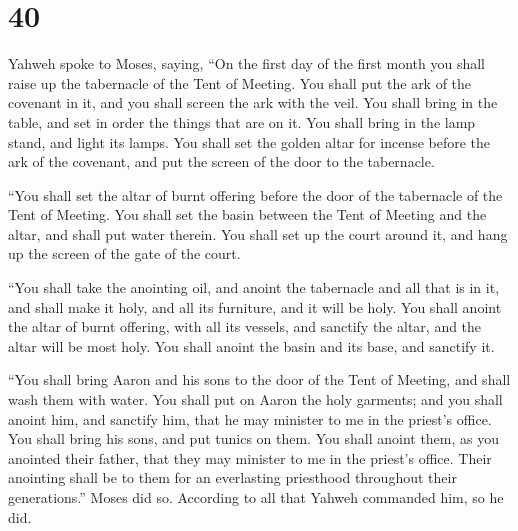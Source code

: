 \hypertarget{section-39}{%
\section{40}\label{section-39}}

 Yahweh spoke to Moses, saying,  ``On the
first day of the first month you shall raise up the tabernacle of the
Tent of Meeting.  You shall put the ark of the covenant in
it, and you shall screen the ark with the veil.  You shall
bring in the table, and set in order the things that are on it. You
shall bring in the lamp stand, and light its lamps.  You
shall set the golden altar for incense before the ark of the covenant,
and put the screen of the door to the tabernacle.

 ``You shall set the altar of burnt offering before the
door of the tabernacle of the Tent of Meeting.  You shall
set the basin between the Tent of Meeting and the altar, and shall put
water therein.  You shall set up the court around it, and
hang up the screen of the gate of the court.

 ``You shall take the anointing oil, and anoint the
tabernacle and all that is in it, and shall make it holy, and all its
furniture, and it will be holy.  You shall anoint the
altar of burnt offering, with all its vessels, and sanctify the altar,
and the altar will be most holy.  You shall anoint the
basin and its base, and sanctify it.

 ``You shall bring Aaron and his sons to the door of the
Tent of Meeting, and shall wash them with water.  You
shall put on Aaron the holy garments; and you shall anoint him, and
sanctify him, that he may minister to me in the priest's office.
 You shall bring his sons, and put tunics on them.
 You shall anoint them, as you anointed their father,
that they may minister to me in the priest's office. Their anointing
shall be to them for an everlasting priesthood throughout their
generations.''  Moses did so. According to all that
Yahweh commanded him, so he did.

